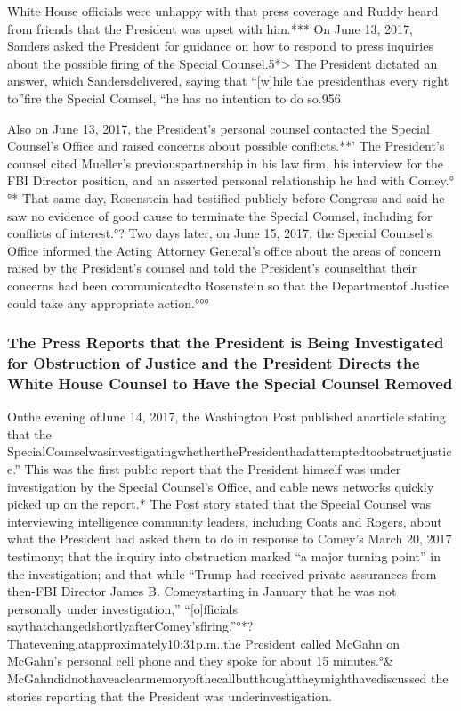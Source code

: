 {White House officials were unhappy with that press coverage and Ruddy heard from friends that the President was upset with him.***
On June 13, 2017, Sanders asked the President for guidance on how to respond to press inquiries about the possible firing of the Special Counsel.5*> The President dictated an answer, which Sandersdelivered, saying that “[w]hile the presidenthas every right to”fire the Special Counsel, “he has no intention to do so.956

Also on June 13, 2017, the President’s personal counsel contacted the Special Counsel’s Office and raised concerns about possible conflicts.**’
The President’s counsel cited Mueller’s previouspartnership in his law firm, his interview for the FBI Director position, and an asserted personal relationship he had with Comey.°°*
That same day, Rosenstein had testified publicly before Congress and said he saw no evidence of good cause to terminate the Special Counsel, including for conflicts of interest.°?
Two days later, on June 15, 2017, the Special Counsel’s Office informed the Acting Attorney General’s office about the areas of concern raised by the President’s counsel and told the President’s counselthat their concerns had been communicatedto Rosenstein so that the Departmentof Justice could take any appropriate action.°°°

\subsubsection{The Press Reports that the President is Being Investigated for Obstruction of Justice and the President Directs the White House Counsel to Have the Special Counsel Removed}

Onthe evening ofJune 14, 2017, the Washington Post published anarticle stating that the SpecialCounselwasinvestigatingwhetherthePresidenthadattemptedtoobstructjustice.”
This was the first public report that the President himself was under investigation by the Special Counsel’s Office, and cable news networks quickly picked up on the report.*
The Post story stated that the Special Counsel was interviewing intelligence community leaders, including Coats and Rogers, about what the President had asked them to do in response to Comey’s March 20, 2017 testimony; that the inquiry into obstruction marked “a major turning point” in the investigation;
and that while “Trump had received private assurances from then-FBI Director James B. Comeystarting in January that he was not personally under investigation,” “[o]fficials saythatchangedshortlyafterComey’sfiring.”°*?
Thatevening,atapproximately10:31p.m.,the President called McGahn on McGahn’s personal cell phone and they spoke for about 15 minutes.°&
McGahndidnothaveaclearmemoryofthecallbutthoughttheymighthavediscussed the stories reporting that the President was underinvestigation.

}
